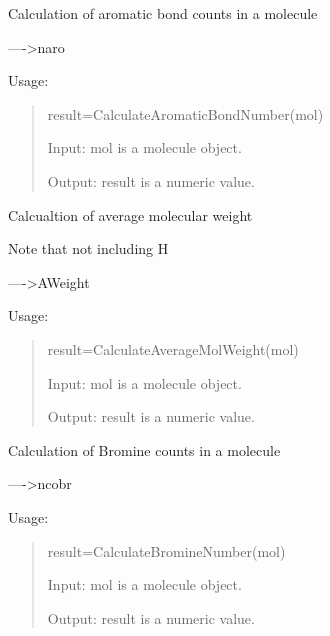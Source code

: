 \documentclass[letterpaper,10pt,english]{sphinxmanual}
\begin{document}

\begin{fulllineitems}
\label{reference/constitution:constitution.CalculateAromaticBondNumber}
Calculation of aromatic bond counts in a molecule

----\textgreater{}naro

Usage:
\begin{quote}

result=CalculateAromaticBondNumber(mol)

Input: mol is a molecule object.

Output: result is a numeric value.
\end{quote}

\end{fulllineitems}


\begin{fulllineitems}
\label{reference/constitution:constitution.CalculateAverageMolWeight}
Calcualtion of average molecular weight

Note that not including H

----\textgreater{}AWeight

Usage:
\begin{quote}

result=CalculateAverageMolWeight(mol)

Input: mol is a molecule object.

Output: result is a numeric value.
\end{quote}

\end{fulllineitems}


\begin{fulllineitems}
\label{reference/constitution:constitution.CalculateBromineNumber}
Calculation of Bromine counts in a molecule

----\textgreater{}ncobr

Usage:
\begin{quote}

result=CalculateBromineNumber(mol)

Input: mol is a molecule object.

Output: result is a numeric value.
\end{quote}

\end{fulllineitems}
\end{document}
